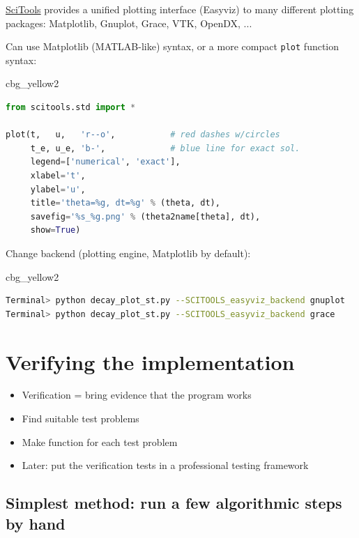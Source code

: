 \documentclass[%
oneside,                 %
final,                   %
10pt]{article}
\newenvironment{_cod_tight}[1]{
   \def\FrameCommand{\colorbox{#1}}
   \FrameRule0.6pt\MakeFramed {\FrameRestore}\vskip3mm}
   {\vskip0mm\endMakeFramed}
\newenvironment{cod}[1]{
\bgroup\rmfamily
\fboxsep=0mm\relax
\begin{_cod_tight}{#1}
\list{}{\parsep=-2mm\parskip=0mm\topsep=0pt\leftmargin=2mm
\rightmargin=2\leftmargin\leftmargin=4pt\relax}
\item\relax}
{\endlist\end{_cod_tight}\egroup}
\begin{document}
\href{{https://github.com/hplgit/scitools}}{SciTools} provides a
unified plotting interface (Easyviz) to many different plotting
packages: Matplotlib, Gnuplot, Grace, VTK, OpenDX, ...

Can use Matplotlib (MATLAB-like) syntax,
or a more compact \texttt{plot} function syntax:

\begin{cod}{cbg_yellow2}\begin{lstlisting}[language=Python,style=simple,xleftmargin=2mm]
from scitools.std import *

plot(t,   u,   'r--o',           # red dashes w/circles
     t_e, u_e, 'b-',             # blue line for exact sol.
     legend=['numerical', 'exact'],
     xlabel='t',
     ylabel='u',
     title='theta=%g, dt=%g' % (theta, dt),
     savefig='%s_%g.png' % (theta2name[theta], dt),
     show=True)
\end{lstlisting}\end{cod}
\noindent

Change backend (plotting engine, Matplotlib by default):

\begin{cod}{cbg_yellow2}\begin{lstlisting}[language=bash,style=simple,xleftmargin=2mm]
Terminal> python decay_plot_st.py --SCITOOLS_easyviz_backend gnuplot
Terminal> python decay_plot_st.py --SCITOOLS_easyviz_backend grace
\end{lstlisting}\end{cod}
\noindent


\section*{Verifying the implementation}
\label{decay:verification}


\begin{itemize}
 \item Verification = bring evidence that the program works

 \item Find suitable test problems

 \item Make function for each test problem

 \item Later: put the verification tests in a professional testing framework
\end{itemize}

\noindent
\subsection*{Simplest method: run a few algorithmic steps by hand}
\end{document}
